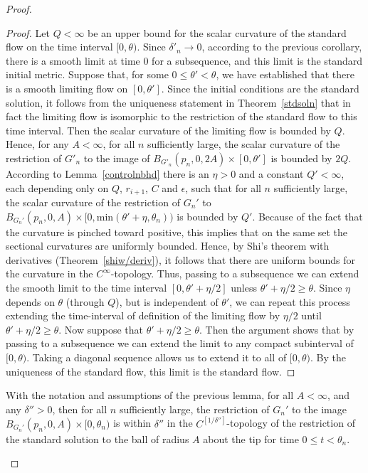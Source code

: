 \begin{proof}
\begin{proof}
Let $Q<\infty$ be an upper bound for the scalar curvature of the
standard flow on the time interval $[0,\theta)$. Since
$\delta'_n\rightarrow 0$, according to the previous corollary, there is
a smooth limit at time $0$ for a subsequence, and this limit is the
standard initial metric. Suppose that, for some $0\le
\theta'<\theta$, we have established that there is a smooth limiting
flow on $[0,\theta']$. Since the initial conditions are the standard
solution, it follows from the uniqueness statement in
Theorem~\ref{stdsoln} that in fact the limiting flow is
isomorphic to the restriction of the standard flow to this time
interval. Then the scalar curvature of the limiting flow is bounded
by $Q$. Hence, for any $A<\infty$, for all $n$ sufficiently large,
the scalar curvature of the restriction of $G'_n$ to the image of
$B_{G'_n}(p_n,0,2A)\times[0,\theta']$ is bounded by $2Q$. According
to Lemma~\ref{controlnbhd} there is an $\eta>0$ and a constant
$Q'<\infty$, each depending only on $Q$, $r_{i+1}$, $C$ and
$\epsilon$, such that for all $n$ sufficiently large, the scalar
curvature of the restriction of $G_n'$ to $B_{G_n'}(p_n,0,A)\times
[0,\mathrm{min}(\theta'+\eta,\theta_n))$ is bounded by $Q'$. Because of
the fact that the curvature is pinched toward positive, this implies
that on the same set the sectional curvatures are uniformly bounded.
Hence, by  Shi's theorem with derivatives
(Theorem~\ref{shiw/deriv}), it follows that there are uniform bounds
for the curvature in the $C^\infty$-topology. Thus, passing to a
subsequence we can extend the smooth limit to the time interval
$[0,\theta'+\eta/2]$ unless $\theta'+\eta/2\ge \theta$. Since $\eta$
depends on $\theta$ (through $Q$), but is independent of $\theta'$,
we can repeat this process extending the time-interval of definition
of the limiting flow by $\eta/2$ until $\theta'+\eta/2\ge \theta$.
Now suppose that $\theta'+\eta/2\ge \theta$. Then the argument shows
that by passing to a subsequence we can extend the limit to any
compact subinterval of $[0,\theta)$. Taking a diagonal sequence
allows us to extend it to all of $[0,\theta)$. By the uniqueness of
the standard flow, this limit is the standard flow.
\end{proof}

\begin{corollary}
\label{cor:surgery-cap-close-to-standard-up-to-theta}\label{goodtotheta}
With the notation and assumptions of the previous lemma, for all
$A<\infty$, and any $\delta''>0$, then  for all $n$ sufficiently
large, the restriction of $G_n'$ to the image
$B_{G_n'}(p_n,0,A)\times [0,\theta_n)$ is within $\delta''$ in the
$C^{[1/\delta'']}$-topology of the restriction of the standard
solution to the ball of radius $A$ about the tip for time $0\le
t<\theta_n$.
\end{corollary}



\end{proof}
